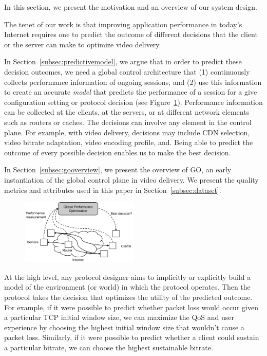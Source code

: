 \label{sec:overview}

In this section, we present the motivation and an overview of our
system design.

The tenet of our work is that improving application performance in
today's Internet requires one to predict the outcome of different
decisions that the client or the server can make to optimize video
delivery. 

In Section~\ref{subsec:predictivemodel}, we argue that in order to
predict these decision outcomes, we need a global control architecture
that (1) continuously collects performance information of ongoing
sessions, and (2) use this information to create an accurate
\emph{model} that predicts the performance of a session for a give
configuration setting or protocol decision (see
Figure~\ref{fig:global-control--overview}).  Performance information
can be collected at the clients, at the servers, or at different
network elements such as routers or caches.  The decisions can involve
any element in the control plane. For example, with video delivery,
decisions may include CDN selection, video bitrate adaptation, video
encoding profile, and.  Being able to predict the outcome of
every possible decision enables us to make the best decision.

In Section~\ref{subsec:gooverview}, we present the overview of GO, an 
early instantiation of the global control plane in video delivery.
We present the quality metrics and attributes used in this paper in 
Section~\ref{subsec:dataset}.

\begin{figure}[h!]
\centering
 \includegraphics[width=0.5\textwidth] {figures/global-control-overview.pdf}
\label{fig:global-control--overview}
\end{figure}

\label{subsec:predictivemodel}
At the high level, any protocol designer aims to implicitly or
explicitly build a model of the environment (or world) in which the
protocol operates. Then the protocol takes the decision that optimizes
the utility of the predicted outcome.  For example, if it were
possible to predict whether packet loss would occur given a particular
TCP initial window size, we can maximize the QoS and user experience
by choosing the highest initial window size that wouldn't cause a
packet loss.  Similarly, if it were possible to predict whether a
client could sustain a particular bitrate, we can choose the highest
sustainable bitrate.

